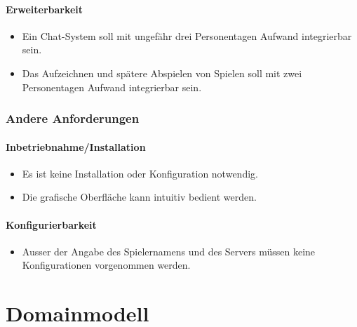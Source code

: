 \documentclass[12pt,halfparskip]{scrartcl}
\begin{document}
\paragraph{Erweiterbarkeit}\label{ssub:erweiterbarkeit} %

\begin{itemize}
	\item Ein Chat-System soll mit ungefähr drei Personentagen Aufwand integrierbar sein.
	\item Das Aufzeichnen und spätere Abspielen von Spielen soll mit zwei Personentagen Aufwand integrierbar sein.
\end{itemize}

\subsubsection{Andere Anforderungen}\label{ssub:andere_anforderungen} %
\paragraph{Inbetriebnahme/Installation}\label{ssub:inbetriebnahme_installation} %
\begin{itemize}
	\item Es ist keine Installation oder Konfiguration notwendig.
	\item Die grafische Oberfläche kann intuitiv bedient werden.
\end{itemize}
\paragraph{Konfigurierbarkeit}\label{ssub:konfigurierbarkeit} %
\begin{itemize}
	\item Ausser der Angabe des Spielernamens und des Servers müssen keine Konfigurationen vorgenommen werden.
\end{itemize}

\newpage

\section{Domainmodell}\label{cha:domainmodell} %
\end{document}
